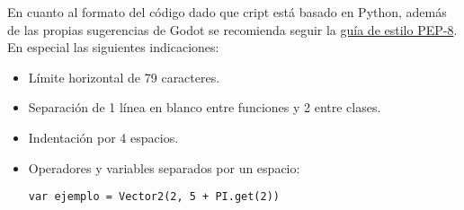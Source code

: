 En cuanto al formato del código dado que cript está basado en Python, además de las propias sugerencias de Godot se recomienda seguir la \href{https://www.python.org/dev/peps/pep-0008/}{guía de estilo PEP-8}. En especial las siguientes indicaciones:
\begin{itemize}[noitemsep]
	\item Límite horizontal de 79 caracteres. 
	\item Separación de 1 línea en blanco entre funciones y 2 entre clases.
	\item Indentación por 4 espacios.
	\item Operadores y variables separados por un espacio:
	\begin{lstlisting}
var ejemplo = Vector2(2, 5 + PI.get(2))
	\end{lstlisting}
\end{itemize}


